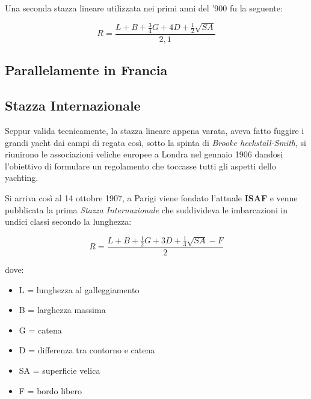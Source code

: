 			Una seconda stazza lineare utilizzata nei primi anni del '900 fu la seguente:
			
			\begin{center}
				\begin{equation}
				R=\frac{L+B+\frac{3}{4}G+4D+\frac{1}{2}\sqrt{SA}}{2,1}
				\label{eq:StazzaFroude}
				\end{equation}
			\end{center}
			
		\subsection{Parallelamente in Francia}
			
		\subsection{Stazza Internazionale}
			Seppur valida tecnicamente, la stazza lineare appena varata, aveva fatto fuggire i grandi yacht dai campi di regata così, sotto la spinta di \textit{Brooke heckstall-Smith}, si riunirono le associazioni veliche europee a Londra nel gennaio 1906 dandosi l'obiettivo di formulare un regolamento che toccasse tutti gli aspetti dello yachting.
			
			Si arriva così al 14 ottobre 1907, a Parigi viene fondato l'attuale \textbf{ISAF} e venne pubblicata la prima \emph{Stazza Internazionale} che suddivideva le imbarcazioni in undici classi secondo la lunghezza:
			
			\begin{center}
				\begin{equation}
				R=\frac{L+B+\frac{1}{2}G+3D+\frac{1}{3}\sqrt{SA}-F }{2}
				\label{eq:Internazionale}
				\end{equation}
			\end{center}
			
			dove:
			\begin{itemize}
				\item L = lunghezza al galleggiamento
				\item B = larghezza massima
				\item G = catena
				\item D = differenza tra contorno e catena
				\item SA = superficie velica
				\item F = bordo libero
			\end{itemize}
			
